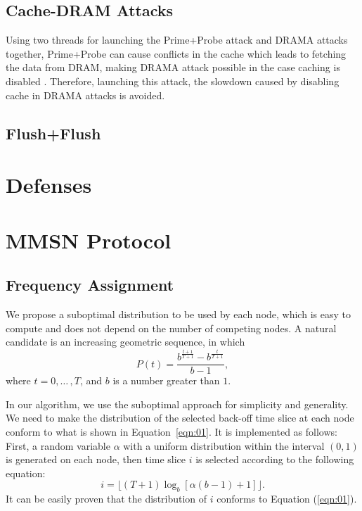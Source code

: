\subsection{Cache-DRAM Attacks}
Using two threads for launching the Prime+Probe attack \cite{primeprobe1, primeprobe2} and DRAMA attacks \cite{drama} together, Prime+Probe can cause conflicts in the cache which leads to fetching the data from DRAM, making DRAMA attack possible in the case caching is disabled \cite{leakycauldron}. Therefore, launching this attack, the slowdown caused by disabling cache in DRAMA attacks is avoided. 

\subsection{Flush+Flush}
\cite{flushflush}
\section{Defenses}
\section{MMSN Protocol}

\subsection{Frequency Assignment}

We propose a suboptimal distribution to be used by each node, which is
easy to compute and does not depend on the number of competing
nodes. A natural candidate is an increasing geometric sequence, in
which
\begin{equation}
\label{eqn:01}
P(t)=\frac{b^{\frac{t+1}{T+1}}-b^{\frac{t}{T+1}}}{b-1},
\end{equation}
where $t=0,{\ldots}\,,T$, and $b$ is a number greater than $1$.

In our algorithm, we use the suboptimal approach for simplicity and
generality. We need to make the distribution of the selected back-off
time slice at each node conform to what is shown in
Equation~\eqref{eqn:01}. It is implemented as follows: First, a random
variable $\alpha$ with a uniform distribution within the interval $(0,
1)$ is generated on each node, then time slice $i$ is selected
according to the following equation:
\[
i=\lfloor(T+1)\log_b[\alpha(b-1)+1]\rfloor.
\]
It can be easily proven that the distribution of $i$ conforms to Equation
(\ref{eqn:01}).

